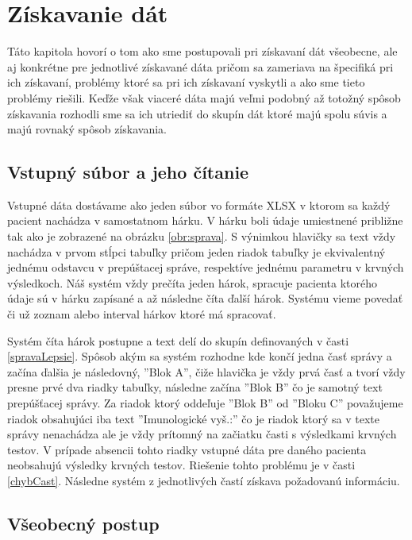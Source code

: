 \chapter{Získavanie dát}
\label{zisk}
Táto kapitola hovorí o tom ako sme postupovali pri získavaní dát všeobecne, ale aj konkrétne pre jednotlivé získavané dáta pričom sa zameriava na špecifiká pri ich získavaní, problémy ktoré sa pri ich získavaní vyskytli a ako sme tieto problémy riešili. Keďže však viaceré dáta majú veľmi podobný až totožný spôsob získavania rozhodli sme sa ich utriediť do skupín dát ktoré majú spolu súvis a majú rovnaký spôsob získavania.

\section{Vstupný súbor a jeho čítanie}

Vstupné dáta dostávame ako jeden súbor vo formáte XLSX v ktorom sa každý pacient nachádza v samostatnom hárku. V hárku boli údaje umiestnené približne tak ako je zobrazené na obrázku \ref{obr:sprava}. S výnimkou hlavičky sa text vždy nachádza v prvom stĺpci tabuľky pričom jeden riadok tabuľky je ekvivalentný jednému odstavcu v prepúštacej správe, respektíve jednému parametru v krvných výsledkoch. Náš systém vždy prečíta jeden hárok, spracuje pacienta ktorého údaje sú v hárku zapísané a až následne číta ďalší hárok. Systému vieme povedať či už zoznam alebo interval hárkov ktoré má spracovať. 

Systém číta hárok postupne a text delí do skupín definovaných v časti \ref{spravaLepsie}. Spôsob akým sa systém rozhodne kde končí jedna časť správy a začína ďalšia je následovný, ''Blok A'', čiže hlavička je vždy prvá časť a tvorí vždy presne prvé dva riadky tabuľky, následne začína ''Blok B'' čo je samotný text prepúšťacej správy. Za riadok ktorý oddeľuje ''Blok B'' od ''Bloku C'' považujeme riadok obsahujúci iba text ''Imunologické vyš.:'' čo je riadok ktorý sa v texte správy nenachádza ale je vždy prítomný na začiatku časti s výsledkami krvných testov. V prípade absencii tohto riadky vstupné dáta pre daného pacienta neobsahujú výsledky krvných testov. Riešenie tohto problému je v časti \ref{chybCast}. Následne systém z jednotlivých častí získava požadovanú informáciu.

\section{Všeobecný postup}

